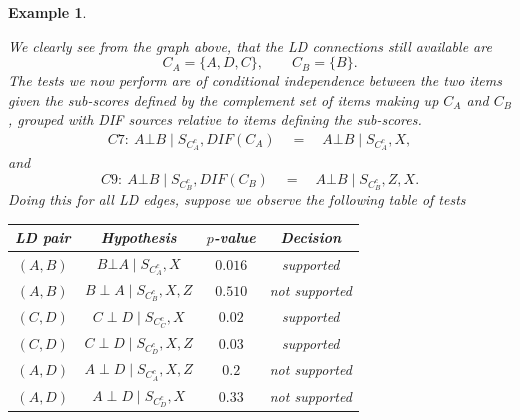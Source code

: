 \documentclass[a4project,12pt]{article}
\theoremstyle{examplestyle}
\newtheorem{example}{Example}[section]
\theoremstyle{defstyle}
\theoremstyle{thmstyle}
\begin{document}
\begin{mybox3}
\begin{example}
\begin{center}
\end{center}
We clearly see from the graph above, that the LD connections still available are
        \begin{equation}
            C_A=\{A,D,C\},\qquad C_B=\{B\}.
        \end{equation}
        The tests we now perform are of conditional independence between the two items given the sub-scores defined by the complement set of items making up $C_A$ and $C_B$, grouped with 
        DIF sources relative to items defining the sub-scores. 
        \begin{align*}
            C7:\ A\bot B\mid S_{C_A^c},DIF(C_A) \quad = \quad A\bot B\mid S_{C_A^c},X,
        \end{align*}
        and 
        \begin{equation*}
            C9:\ A\bot B\mid S_{C_B^c},DIF(C_B) \quad = \quad A\bot B\mid S_{C_B^c},Z,X.
        \end{equation*}
    Doing this for all LD edges, suppose we observe the following table of tests
    \begin{table}[H]
     \centering
    \begin{tabular}{c c c c}
            \hline
            LD pair & Hypothesis & $p$-value & Decision \\
            \hline
            $(A,B)$ & $B \bot A \mid S_{C_A^c},X$ & $0.016$ & supported\\
            $(A,B)$ & $B \perp A \mid S_{C_B^c},X,Z$ & $0.510$ & not supported\\
            $(C,D)$ & $C \perp D \mid S_{C_C^c},X$ & $0.02$ & supported \\
            $(C,D)$ & $C \perp D \mid S_{C_D^c},X,Z$ & $0.03$ & supported \\
            $(A,D)$ & $A \perp D \mid S_{C_A^c},X,Z$ & $0.2$ & not supported \\
            $(A,D)$ & $A \perp D \mid S_{C_D^c},X$ & $0.33$ & not supported \\

\end{tabular}
\end{table}
\end{example}
\end{mybox3}
\end{document}
